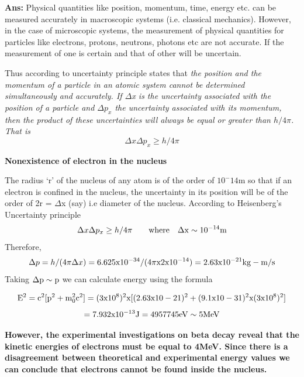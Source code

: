 \documentclass{exam}
\begin{document}
\begin{questions}
\textbf{Ans:} Physical quantities like position, momentum, time, energy etc. can be measured accurately in macroscopic systems (i.e. classical mechanics). However, in the case of microscopic systems, the measurement of physical quantities for particles like electrons, protons, neutrons, photons etc are not accurate. If the measurement of one is certain and that of other will be uncertain. 

Thus according to uncertainty principle states that \textit{the position and the momentum of a particle in an atomic system cannot be determined simultaneously and accurately. If $\Delta$x is
the uncertainty associated with the position of a particle and $\Delta p_x$ the uncertainty associated with its momentum, then the product of these uncertainties will always be equal or greater than $h/4\pi$. That is} 
\begin{equation*}
\Delta x  \Delta p_x \geq h/4\pi 
\end{equation*}

\begin{center} \textbf{ Nonexistence of electron in the nucleus} \end{center}
	
The radius ‘r’ of the nucleus of any atom is of the order of $10^-14$m so that if an electron is confined in the nucleus, the uncertainty in its position will be of the order of 2r = $\Delta$x (say) i.e diameter of the nucleus. According to Heisenberg's Uncertainty principle 
\begin{equation*}
\Delta x  \Delta p_x \geq h/4\pi  \qquad \rm where \quad \Delta x \sim 10^{-14}  m
\end{equation*}
Therefore,
\begin{equation*}
\Delta p = h/(4 \pi \Delta x) = \rm 6.625 x 10^{-34}/ (4 \pi x 2x10^{-14}) = 2.63 x 10^{-21} kg-m/s
\end{equation*}
Taking $ \rm \Delta p \sim  p $ we can calculate energy using the formula

\begin{equation*}
\rm E^2 = c^2 [ p^2 + m_{0}^{2}c^2 ] = (3x 10^8)^2 x [(2.63 x 10-21)^2 + (9.1x10-31)^2 x (3x10^8)^2] 
\end{equation*}
\begin{equation*}
\rm = 7.932 x 10^{-13} J = 4957745 eV \sim 5 MeV
\end{equation*}

\textbf{However, the experimental investigations on beta decay reveal that the kinetic energies of electrons must be equal to 4MeV. Since there is a disagreement between theoretical and experimental energy values we can conclude that electrons cannot be found inside the nucleus.}


\end{questions}
\end{document}

